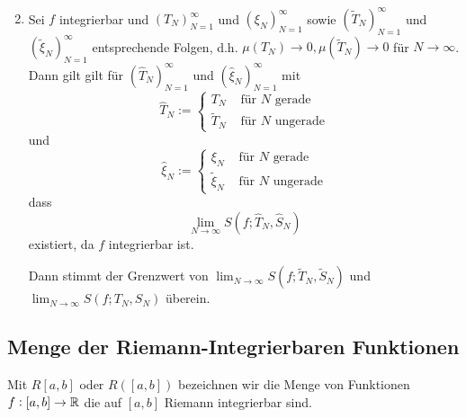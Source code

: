 \begin{enumerate}[label= (\alph*)]
\begin{eqnarray*}
        \end{eqnarray*}
    \item Sei $f$ integrierbar und ${(T_N)}_{N=1}^\infty$ und
        ${(\xi_N)}_{N=1}^\infty$ sowie ${(\tilde{T}_N)}_{N=1}^\infty$ und
            ${(\tilde{\xi}_N)}_{N=1}^\infty$ entsprechende Folgen,
            d.h. $\mu(T_N) \rightarrow 0, \mu(\tilde{T}_N) \rightarrow 0$
            für $N \rightarrow \infty$. Dann gilt gilt für ${(\hat{T}_N)}_{N=1}^\infty$
            und ${(\hat{\xi}_N)}_{N=1}^\infty$ mit
            \begin{equation*}
                \hat{T}_N :=
                \begin{cases}
                    T_N &\text{ für } N \text{ gerade}\\
                    \tilde{T}_N &\text{ für } N \text{ ungerade}
                \end{cases}
            \end{equation*}
            und
            \begin{equation*}
                \hat{\xi}_N :=
                \begin{cases}
                    \xi_N &\text{ für } N \text{ gerade}\\
                    \tilde{\xi}_N &\text{ für } N \text{ ungerade}
                \end{cases}
            \end{equation*}
            dass
            \begin{equation*}
                \lim_{N \rightarrow \infty} S(f; \hat{T}_N, \hat{S}_N)
            \end{equation*}
            existiert, da $f$ integrierbar ist.

            Dann stimmt der Grenzwert von
            $\lim_{N \rightarrow \infty} S(f; \tilde{T}_N, \tilde{S}_N)$ und
            $\lim_{N \rightarrow \infty} S(f; T_N, S_N)$ überein.
\end{enumerate}

\subsection{Menge der Riemann-Integrierbaren Funktionen}
Mit $R [a, b]$ oder $R ([a, b])$ bezeichnen wir die Menge von Funktionen
$f: [a, b] \rightarrow \mathbb{R}$ die auf $[a, b]$ Riemann integrierbar sind.

